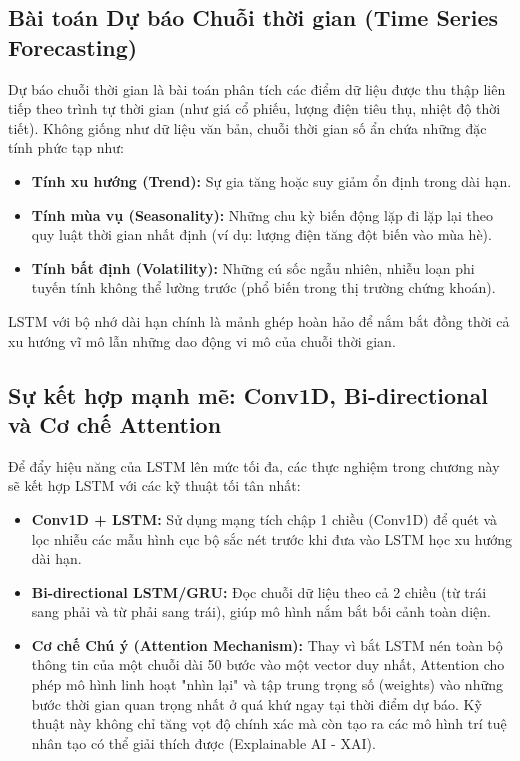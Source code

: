 \subsection{Bài toán Dự báo Chuỗi thời gian (Time Series Forecasting)}
Dự báo chuỗi thời gian là bài toán phân tích các điểm dữ liệu được thu thập liên tiếp theo trình tự thời gian (như giá cổ phiếu, lượng điện tiêu thụ, nhiệt độ thời tiết). Không giống như dữ liệu văn bản, chuỗi thời gian số ẩn chứa những đặc tính phức tạp như:
\begin{itemize}
    \item \textbf{Tính xu hướng (Trend):} Sự gia tăng hoặc suy giảm ổn định trong dài hạn.
    \item \textbf{Tính mùa vụ (Seasonality):} Những chu kỳ biến động lặp đi lặp lại theo quy luật thời gian nhất định (ví dụ: lượng điện tăng đột biến vào mùa hè).
    \item \textbf{Tính bất định (Volatility):} Những cú sốc ngẫu nhiên, nhiễu loạn phi tuyến tính không thể lường trước (phổ biến trong thị trường chứng khoán).
\end{itemize}
LSTM với bộ nhớ dài hạn chính là mảnh ghép hoàn hảo để nắm bắt đồng thời cả xu hướng vĩ mô lẫn những dao động vi mô của chuỗi thời gian.

\subsection{Sự kết hợp mạnh mẽ: Conv1D, Bi-directional và Cơ chế Attention}
Để đẩy hiệu năng của LSTM lên mức tối đa, các thực nghiệm trong chương này sẽ kết hợp LSTM với các kỹ thuật tối tân nhất:
\begin{itemize}
    \item \textbf{Conv1D + LSTM:} Sử dụng mạng tích chập 1 chiều (Conv1D) để quét và lọc nhiễu các mẫu hình cục bộ sắc nét trước khi đưa vào LSTM học xu hướng dài hạn.
    \item \textbf{Bi-directional LSTM/GRU:} Đọc chuỗi dữ liệu theo cả 2 chiều (từ trái sang phải và từ phải sang trái), giúp mô hình nắm bắt bối cảnh toàn diện.
    \item \textbf{Cơ chế Chú ý (Attention Mechanism):} Thay vì bắt LSTM nén toàn bộ thông tin của một chuỗi dài 50 bước vào một vector duy nhất, Attention cho phép mô hình linh hoạt "nhìn lại" và tập trung trọng số (weights) vào những bước thời gian quan trọng nhất ở quá khứ ngay tại thời điểm dự báo. Kỹ thuật này không chỉ tăng vọt độ chính xác mà còn tạo ra các mô hình trí tuệ nhân tạo có thể giải thích được (Explainable AI - XAI).
\end{itemize}

